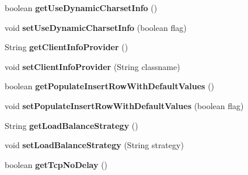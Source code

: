 \begin{DoxyCompactItemize}
boolean {\bfseries get\+Use\+Dynamic\+Charset\+Info} ()
\item 
\mbox{\label{interfacecom_1_1mysql_1_1jdbc_1_1_connection_properties_a329ea731ebbb1b90088ded754a7b29c3}} 
void {\bfseries set\+Use\+Dynamic\+Charset\+Info} (boolean flag)
\item 
\mbox{\label{interfacecom_1_1mysql_1_1jdbc_1_1_connection_properties_a8c764e24a07695e3c63534ae72a209cc}} 
String {\bfseries get\+Client\+Info\+Provider} ()
\item 
\mbox{\label{interfacecom_1_1mysql_1_1jdbc_1_1_connection_properties_af004caaf7804b98d3f0093b06b709194}} 
void {\bfseries set\+Client\+Info\+Provider} (String classname)
\item 
\mbox{\label{interfacecom_1_1mysql_1_1jdbc_1_1_connection_properties_a1adc57578a2c9a050a786157c0b559c5}} 
boolean {\bfseries get\+Populate\+Insert\+Row\+With\+Default\+Values} ()
\item 
\mbox{\label{interfacecom_1_1mysql_1_1jdbc_1_1_connection_properties_ae8d3d9d017af5d12341c812a70764bde}} 
void {\bfseries set\+Populate\+Insert\+Row\+With\+Default\+Values} (boolean flag)
\item 
\mbox{\label{interfacecom_1_1mysql_1_1jdbc_1_1_connection_properties_a2c62549a82701507e6ccaf72634de3d8}} 
String {\bfseries get\+Load\+Balance\+Strategy} ()
\item 
\mbox{\label{interfacecom_1_1mysql_1_1jdbc_1_1_connection_properties_afe19bb6a30ce31b2cf73361f0fd8056b}} 
void {\bfseries set\+Load\+Balance\+Strategy} (String strategy)
\item 
\mbox{\label{interfacecom_1_1mysql_1_1jdbc_1_1_connection_properties_a0c50b6105598ed5a7ff41e5ca815a9b6}} 
boolean {\bfseries get\+Tcp\+No\+Delay} ()
\item 

\end{DoxyCompactItemize}
